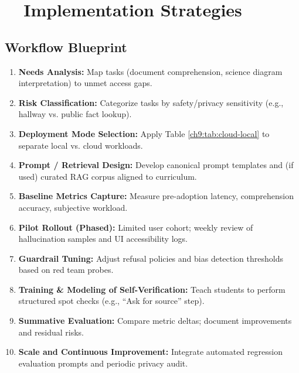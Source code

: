 \section{~~Implementation Strategies}\label{ch9:sec:implementation-strategies}

\subsection{Workflow Blueprint}
\begin{enumerate}
	\item \textbf{Needs Analysis:} Map tasks (document comprehension, science diagram interpretation) to unmet access gaps.\supercite{arxiv_visual_impairment}
	\item \textbf{Risk Classification:} Categorize tasks by safety/privacy sensitivity (e.g., hallway  vs. public fact lookup).
	\item \textbf{Deployment Mode Selection:} Apply Table \ref{ch9:tab:cloud-local} to separate local vs. cloud workloads.
	\item \textbf{Prompt / Retrieval Design:} Develop canonical prompt templates and (if used) curated RAG corpus aligned to curriculum.
	\item \textbf{Baseline Metrics Capture:} Measure pre-adoption latency, comprehension accuracy, subjective workload.
	\item \textbf{Pilot Rollout (Phased):} Limited user cohort; weekly review of hallucination samples and UI accessibility logs.
	\item \textbf{Guardrail Tuning:} Adjust refusal policies and bias detection thresholds based on red team probes.
	\item \textbf{Training \& Modeling of Self-Verification:} Teach students to perform structured spot checks (e.g., ``Ask for source'' step).
	\item \textbf{Summative Evaluation:} Compare metric deltas; document improvements and residual risks.
	\item \textbf{Scale and Continuous Improvement:} Integrate automated regression evaluation prompts and periodic privacy audit.
\end{enumerate}

